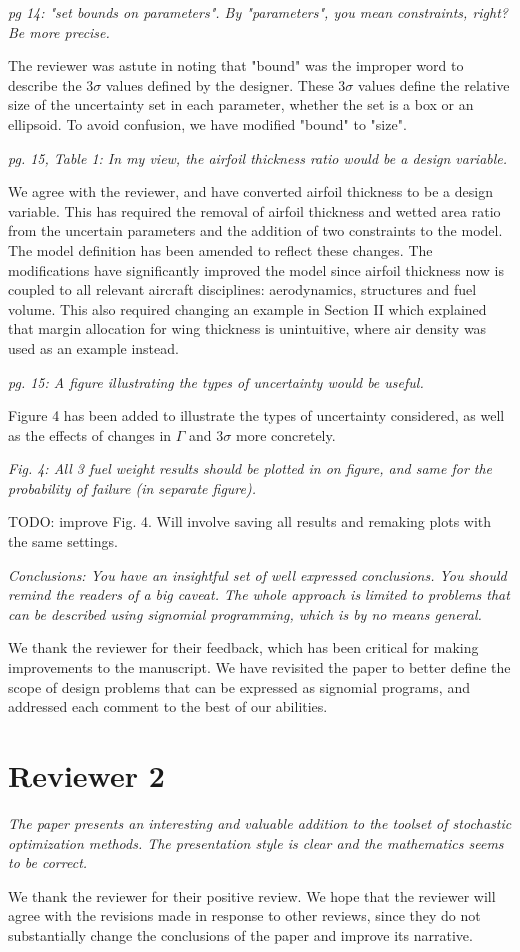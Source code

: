 \documentclass[11pt]{article}
\begin{document}
\textit{pg 14: "set bounds on parameters". By "parameters", you mean constraints, right? Be more precise.}

The reviewer was astute in noting that "bound" was the improper word to describe the $3\sigma$ values
defined by the designer. These $3\sigma$ values define the relative size
of the uncertainty set in each parameter, whether the set is a box or an ellipsoid.
To avoid confusion, we have modified "bound" to "size". 

\textit{pg. 15, Table 1: In my view, the airfoil thickness ratio would be a design variable.}

We agree with the reviewer, and have converted airfoil thickness to be a design variable. 
This has required the removal of airfoil thickness and wetted area ratio from the uncertain parameters
and the addition of two constraints to the model. The model definition has been
amended to reflect these changes. The modifications have significantly improved the model since 
airfoil thickness now is coupled to all relevant aircraft disciplines: aerodynamics, structures and 
fuel volume. This also required changing an example in Section II 
which explained that margin allocation for wing thickness 
is unintuitive, where air density was used as an example instead. 

\textit{pg. 15: A figure illustrating the types of uncertainty would be useful.}

Figure 4 has been added to illustrate the types of uncertainty considered, 
as well as the effects of changes in $\Gamma$ and $3\sigma$ more concretely. 

\textit{Fig. 4: All 3 fuel weight results should be plotted in on figure, and same for the probability of failure (in separate figure).}

TODO: improve Fig. 4. Will involve saving all results and remaking plots with the same settings. 

\textit{Conclusions: You have an insightful set of well expressed conclusions. You should remind the readers of a big caveat. The whole approach is limited to problems that can be described using signomial programming, which is by no means general.}

We thank the reviewer for their feedback, which has been critical for making improvements to the manuscript. We 
have revisited the paper to better define the scope of design problems that can be expressed as signomial 
programs, and addressed each comment to the best of our abilities. 

\section{Reviewer 2}

\textit{The paper presents an interesting and valuable addition to the toolset of stochastic optimization methods. 
The presentation style is clear and the mathematics seems to be correct.}

We thank the reviewer for their positive review. We hope that the reviewer
will agree with the revisions made in response to other reviews, since
they do not substantially change the conclusions of the paper
and improve its narrative. 
\end{document}

